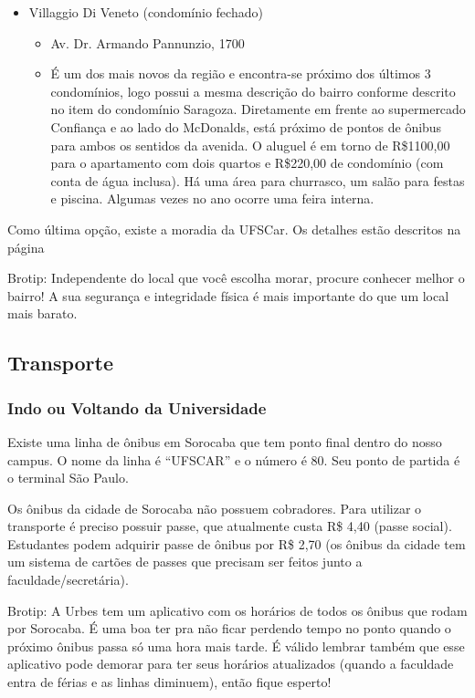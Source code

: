 \begin{itemize}
  \item Villaggio Di Veneto (condomínio fechado)
    \begin{itemize}
      \item Av. Dr. Armando Pannunzio, 1700
      \item {É um dos mais novos da região e encontra-se próximo dos últimos 3 condomínios, logo possui a mesma descrição do bairro conforme descrito no item do condomínio Saragoza. Diretamente em frente ao supermercado Confiança e ao lado do McDonalds, está próximo de pontos de ônibus para ambos os sentidos da avenida.
        O aluguel é em torno de R\$1100,00 para o apartamento com dois quartos e R\$220,00 de condomínio (com conta de água inclusa). Há uma área para churrasco, um salão para festas e piscina. Algumas vezes no ano ocorre uma feira interna.}
    \end{itemize}
\end{itemize}

Como última opção, existe a moradia da UFSCar. Os detalhes estão descritos na página \pageref{moradia}

Brotip: Independente do local que você escolha morar, procure conhecer melhor o bairro! A sua segurança e integridade física é mais importante do que um local mais barato.

\subsection{Transporte}
\subsubsection{Indo ou Voltando da Universidade}
Existe uma linha de ônibus em Sorocaba que tem ponto final dentro do nosso campus. O nome da linha é “UFSCAR” e o número é 80. Seu ponto de partida é o terminal São Paulo.

Os ônibus da cidade de Sorocaba não possuem cobradores. Para utilizar o transporte é preciso possuir passe, que atualmente custa R\$ 4,40 (passe social). Estudantes podem adquirir passe de ônibus por R\$ 2,70 (os ônibus da cidade tem um sistema de cartões de passes que precisam ser feitos junto a faculdade/secretária).

Brotip: A Urbes tem um aplicativo com os horários de todos os ônibus que rodam por Sorocaba. É uma boa ter pra não ficar perdendo tempo no ponto quando o próximo ônibus passa só uma hora mais tarde. É válido lembrar também que esse aplicativo pode demorar para ter seus horários atualizados (quando a faculdade entra de férias e as linhas diminuem), então fique esperto!


